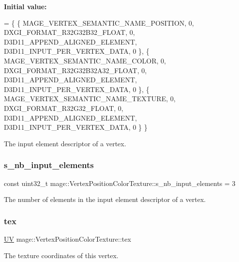 {\bfseries Initial value\+:}
\begin{DoxyCode}
= \{
        \{ MAGE\_VERTEX\_SEMANTIC\_NAME\_POSITION, 0, DXGI\_FORMAT\_R32G32B32\_FLOAT,    0, 
      D3D11\_APPEND\_ALIGNED\_ELEMENT, D3D11\_INPUT\_PER\_VERTEX\_DATA, 0 \},
        \{ MAGE\_VERTEX\_SEMANTIC\_NAME\_COLOR,    0, DXGI\_FORMAT\_R32G32B32A32\_FLOAT, 0, 
      D3D11\_APPEND\_ALIGNED\_ELEMENT, D3D11\_INPUT\_PER\_VERTEX\_DATA, 0 \},
        \{ MAGE\_VERTEX\_SEMANTIC\_NAME\_TEXTURE,  0, DXGI\_FORMAT\_R32G32\_FLOAT,       0, 
      D3D11\_APPEND\_ALIGNED\_ELEMENT, D3D11\_INPUT\_PER\_VERTEX\_DATA, 0 \}
    \}
\end{DoxyCode}
The input element descriptor of a vertex. \hypertarget{structmage_1_1_vertex_position_color_texture_a6b05ba63dce3ba54ad4b1b39b3c6f4f8}{}\label{structmage_1_1_vertex_position_color_texture_a6b05ba63dce3ba54ad4b1b39b3c6f4f8} 
\subsubsection{\texorpdfstring{s\+\_\+nb\+\_\+input\+\_\+elements}{s\_nb\_input\_elements}}
{\footnotesize\ttfamily const uint32\+\_\+t mage\+::\+Vertex\+Position\+Color\+Texture\+::s\+\_\+nb\+\_\+input\+\_\+elements = 3\hspace{0.3cm}{\ttfamily [static]}}

The number of elements in the input element descriptor of a vertex. \hypertarget{structmage_1_1_vertex_position_color_texture_adfbaa105e46bb65f502ec33eaa2e8b15}{}\label{structmage_1_1_vertex_position_color_texture_adfbaa105e46bb65f502ec33eaa2e8b15} 
\subsubsection{\texorpdfstring{tex}{tex}}
{\footnotesize\ttfamily \hyperlink{structmage_1_1_u_v}{UV} mage\+::\+Vertex\+Position\+Color\+Texture\+::tex}

The texture coordinates of this vertex. 